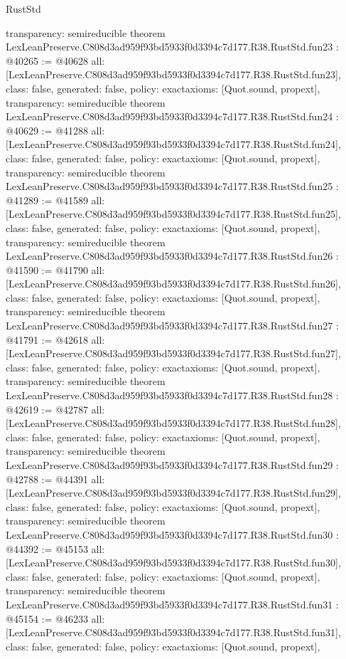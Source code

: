 \begin{lexlean}{RustStd}
\begin{coremodule}
{  transparency: semireducible
}
theorem LexLeanPreserve.C808d3ad959f93bd5933f0d3394c7d177.R38.RustStd.fun23 : @40265 := @40628 {
  all: [LexLeanPreserve.C808d3ad959f93bd5933f0d3394c7d177.R38.RustStd.fun23],
  class: false,
  generated: false,
  policy: exact{axioms: [Quot.sound, propext]},
  transparency: semireducible
}
theorem LexLeanPreserve.C808d3ad959f93bd5933f0d3394c7d177.R38.RustStd.fun24 : @40629 := @41288 {
  all: [LexLeanPreserve.C808d3ad959f93bd5933f0d3394c7d177.R38.RustStd.fun24],
  class: false,
  generated: false,
  policy: exact{axioms: [Quot.sound, propext]},
  transparency: semireducible
}
theorem LexLeanPreserve.C808d3ad959f93bd5933f0d3394c7d177.R38.RustStd.fun25 : @41289 := @41589 {
  all: [LexLeanPreserve.C808d3ad959f93bd5933f0d3394c7d177.R38.RustStd.fun25],
  class: false,
  generated: false,
  policy: exact{axioms: [Quot.sound, propext]},
  transparency: semireducible
}
theorem LexLeanPreserve.C808d3ad959f93bd5933f0d3394c7d177.R38.RustStd.fun26 : @41590 := @41790 {
  all: [LexLeanPreserve.C808d3ad959f93bd5933f0d3394c7d177.R38.RustStd.fun26],
  class: false,
  generated: false,
  policy: exact{axioms: [Quot.sound, propext]},
  transparency: semireducible
}
theorem LexLeanPreserve.C808d3ad959f93bd5933f0d3394c7d177.R38.RustStd.fun27 : @41791 := @42618 {
  all: [LexLeanPreserve.C808d3ad959f93bd5933f0d3394c7d177.R38.RustStd.fun27],
  class: false,
  generated: false,
  policy: exact{axioms: [Quot.sound, propext]},
  transparency: semireducible
}
theorem LexLeanPreserve.C808d3ad959f93bd5933f0d3394c7d177.R38.RustStd.fun28 : @42619 := @42787 {
  all: [LexLeanPreserve.C808d3ad959f93bd5933f0d3394c7d177.R38.RustStd.fun28],
  class: false,
  generated: false,
  policy: exact{axioms: [Quot.sound, propext]},
  transparency: semireducible
}
theorem LexLeanPreserve.C808d3ad959f93bd5933f0d3394c7d177.R38.RustStd.fun29 : @42788 := @44391 {
  all: [LexLeanPreserve.C808d3ad959f93bd5933f0d3394c7d177.R38.RustStd.fun29],
  class: false,
  generated: false,
  policy: exact{axioms: [Quot.sound, propext]},
  transparency: semireducible
}
theorem LexLeanPreserve.C808d3ad959f93bd5933f0d3394c7d177.R38.RustStd.fun30 : @44392 := @45153 {
  all: [LexLeanPreserve.C808d3ad959f93bd5933f0d3394c7d177.R38.RustStd.fun30],
  class: false,
  generated: false,
  policy: exact{axioms: [Quot.sound, propext]},
  transparency: semireducible
}
theorem LexLeanPreserve.C808d3ad959f93bd5933f0d3394c7d177.R38.RustStd.fun31 : @45154 := @46233 {
  all: [LexLeanPreserve.C808d3ad959f93bd5933f0d3394c7d177.R38.RustStd.fun31],
  class: false,
  generated: false,
  policy: exact{axioms: [Quot.sound, propext]},
}
\end{coremodule}
\end{lexlean}
